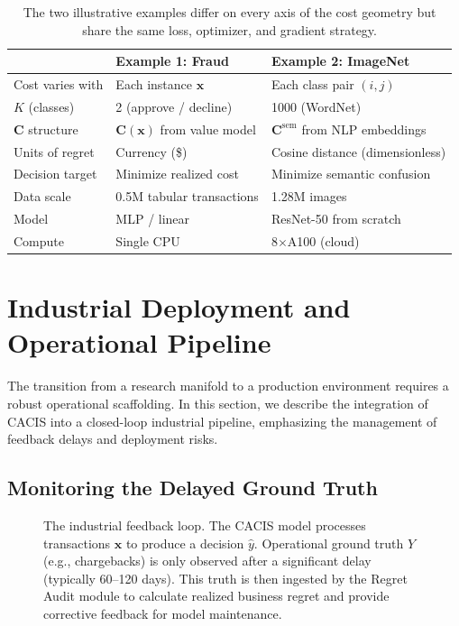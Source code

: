 \documentclass[sigconf,anonymous]{acmart}
\newcommand{\CACIS}{\textsc{CACIS}}
\newcommand{\vx}{\mathbf{x}}
\newcommand{\mC}{\mathbf{C}}
\begin{document}
\begin{table}[h]
\centering
\caption{The two illustrative examples differ on every axis of the cost geometry but share the same loss, optimizer, and gradient strategy.}
\label{tab:examples}
\setlength{\tabcolsep}{4pt}
\begin{tabular}{lll}
\toprule
& \textbf{Example 1: Fraud} & \textbf{Example 2: ImageNet} \\
\midrule
Cost varies with    & Each instance $\vx$            & Each class pair $(i, j)$ \\
$K$ (classes)       & 2 (approve / decline)          & 1000 (WordNet) \\
$\mC$ structure     & $\mC(\vx)$ from value model    & $\mC^{\mathrm{sem}}$ from NLP embeddings \\
Units of regret     & Currency (\$)                   & Cosine distance (dimensionless) \\
Decision target     & Minimize realized cost          & Minimize semantic confusion \\
Data scale          & 0.5M tabular transactions       & 1.28M images \\
Model                & MLP / linear                    & ResNet-50 from scratch \\
Compute              & Single CPU                      & 8$\times$A100 (cloud) \\
\bottomrule
\end{tabular}
\end{table}

\section{Industrial Deployment and Operational Pipeline}
\label{sec:pipeline}
The transition from a research manifold to a production environment requires a robust operational scaffolding. In this section, we describe the integration of \CACIS{} into a closed-loop industrial pipeline, emphasizing the management of feedback delays and deployment risks.

\subsection{Monitoring the Delayed Ground Truth}

\begin{figure}[h]
\centering
\scalebox{0.60}{}
\caption{The industrial feedback loop. The \CACIS{} model processes transactions $\vx$ to produce a decision $\hat{y}$. Operational ground truth $Y$ (e.g., chargebacks) is only observed after a significant delay (typically 60--120 days). This truth is then ingested by the Regret Audit module to calculate realized business regret and provide corrective feedback for model maintenance.}
\label{fig:industrial_pipeline}
\end{figure}
\end{document}
